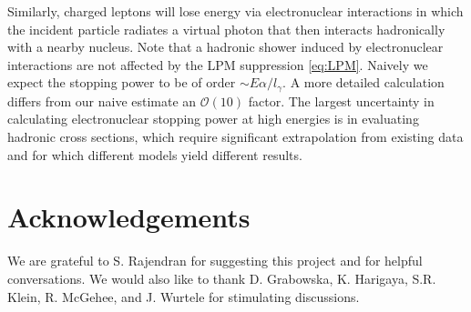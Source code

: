 \documentclass[twocolumn,showpacs,preprintnumbers,amsmath,amssymb,prd]{revtex4}
\newcommand{\OO}{\mathcal{O}}
\begin{document}
\begin{appendices}
Similarly, charged leptons will lose energy via electronuclear interactions in which the incident particle radiates a virtual photon that then interacts hadronically with a nearby nucleus. Note that a hadronic shower induced by electronuclear interactions are not affected by the LPM suppression \eqref{eq:LPM}. Naively we expect the stopping power to be of order $\sim E \alpha/l_\gamma$. A more detailed calculation \cite{Gerhardt:2010bj} differs from our naive estimate an $\OO(10)$ factor. The largest uncertainty in calculating electronuclear stopping power at high energies is in evaluating hadronic cross sections, which require significant extrapolation from existing data and for which different models yield different results.

\end{appendices}

\section*{Acknowledgements}
We are grateful to S. Rajendran for suggesting this project and for helpful conversations. We would also like to thank D. Grabowska, K. Harigaya, S.R. Klein, R. McGehee, and J. Wurtele for stimulating discussions.


\end{document}
